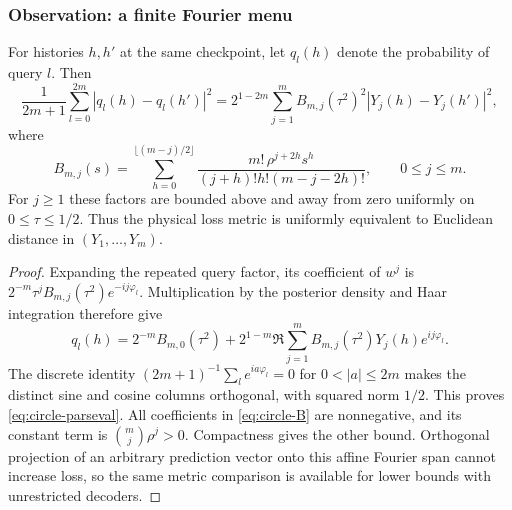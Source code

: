 \subsubsection{Observation: a finite Fourier menu}
\begin{lemma}\label{lem:circle-query-metric}
For histories $h,h'$ at the same checkpoint, let $q_l(h)$ denote the
probability of query $l$. Then
\begin{equation}\label{eq:circle-parseval}
 \frac1{2m+1}\sum_{l=0}^{2m}|q_l(h)-q_l(h')|^2
 =2^{1-2m}\sum_{j=1}^{m} B_{m,j}(\tau^2)^2
                       |Y_j(h)-Y_j(h')|^2,
\end{equation}
where
\begin{equation}\label{eq:circle-B}
 B_{m,j}(s)=\sum_{h=0}^{\lfloor(m-j)/2\rfloor}
 \frac{m!\,\rho^{j+2h}s^h}{(j+h)!h!(m-j-2h)!},\qquad 0\le j\le m.
\end{equation}
For $j\ge1$ these factors are bounded above and away from zero uniformly
on $0\le\tau\le1/2$. Thus the physical loss metric is uniformly
equivalent to Euclidean distance in $(Y_1,\ldots,Y_m)$.
\end{lemma}
\begin{proof}
Expanding the repeated query factor, its coefficient of $w^j$ is
$2^{-m}\tau^jB_{m,j}(\tau^2)e^{-ij\varphi_l}$. Multiplication by
the posterior density and Haar integration therefore give
\[
 q_l(h)=2^{-m}B_{m,0}(\tau^2)+
       2^{1-m}\Re\sum_{j=1}^{m}B_{m,j}(\tau^2)Y_j(h)e^{ij\varphi_l}.
\]
The discrete identity
$(2m+1)^{-1}\sum_l e^{ia\varphi_l}=0$ for
$0<|a|\le2m$ makes the distinct sine and cosine columns orthogonal,
with squared norm $1/2$. This proves \eqref{eq:circle-parseval}.
All coefficients in \eqref{eq:circle-B} are nonnegative, and its
constant term is $\binom mj\rho^j>0$. Compactness gives the other
bound. Orthogonal projection of an arbitrary prediction vector onto
this affine Fourier span cannot increase loss, so the same metric
comparison is available for lower bounds with unrestricted decoders.
\end{proof}

